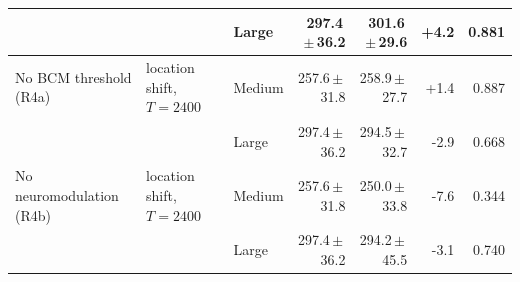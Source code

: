 \begin{table}[htbp]
\begin{tabular}{lllrrrr}
 &  & Large & 297.4\,$\pm$\,36.2 & 301.6\,$\pm$\,29.6 & +4.2 & 0.881 \\
\hline
No BCM threshold (R4a) & location shift, $T=2400$ & Medium & 257.6\,$\pm$\,31.8 & 258.9\,$\pm$\,27.7 & +1.4 & 0.887 \\
 &  & Large & 297.4\,$\pm$\,36.2 & 294.5\,$\pm$\,32.7 & -2.9 & 0.668 \\
\hline
No neuromodulation (R4b) & location shift, $T=2400$ & Medium & 257.6\,$\pm$\,31.8 & 250.0\,$\pm$\,33.8 & -7.6 & 0.344 \\
 &  & Large & 297.4\,$\pm$\,36.2 & 294.2\,$\pm$\,45.5 & -3.1 & 0.740 \\
\hline
\end{tabular}
\end{table}
